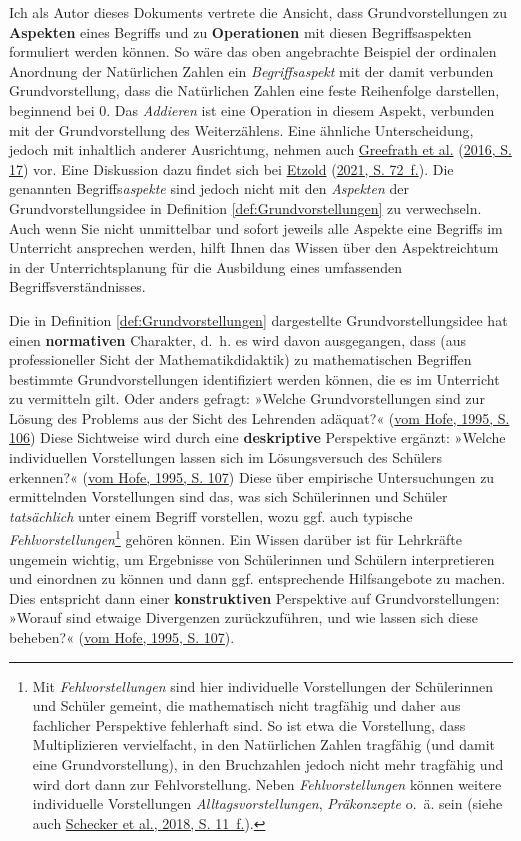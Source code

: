 \documentclass[
  ngerman,
]{scrbook}
\theoremstyle{definition}
\theoremstyle{definition}
\theoremstyle{definition}
\theoremstyle{definition}
\theoremstyle{remark}
\begin{document}
Ich als Autor dieses Dokuments vertrete die Ansicht, dass Grundvorstellungen zu \textbf{Aspekten} eines Begriffs und zu \textbf{Operationen} mit diesen Begriffsaspekten formuliert werden können. So wäre das oben angebrachte Beispiel der ordinalen Anordnung der Natürlichen Zahlen ein \emph{Begriffsaspekt} mit der damit verbunden Grundvorstellung, dass die Natürlichen Zahlen eine feste Reihenfolge darstellen, beginnend bei \(0\). Das \emph{Addieren} ist eine Operation in diesem Aspekt, verbunden mit der Grundvorstellung des Weiterzählens. Eine ähnliche Unterscheidung, jedoch mit inhaltlich anderer Ausrichtung, nehmen auch \protect\hyperlink{ref-Greefrath2016}{Greefrath et al.} (\protect\hyperlink{ref-Greefrath2016}{2016, S. 17}) vor. Eine Diskussion dazu findet sich bei \protect\hyperlink{ref-Etzold2021}{Etzold} (\protect\hyperlink{ref-Etzold2021}{2021, S. 72~f.}). Die genannten Begriffs\emph{aspekte} sind jedoch nicht mit den \emph{Aspekten} der Grundvorstellungsidee in Definition \ref{def:Grundvorstellungen} zu verwechseln.
Auch wenn Sie nicht unmittelbar und sofort jeweils alle Aspekte eine Begriffs im Unterricht ansprechen werden, hilft Ihnen das Wissen über den Aspektreichtum in der Unterrichtsplanung für die Ausbildung eines umfassenden Begriffsverständnisses.

Die in Definition \ref{def:Grundvorstellungen} dargestellte Grundvorstellungsidee hat einen \textbf{normativen} Charakter, d.~h. es wird davon ausgegangen, dass (aus professioneller Sicht der Mathematikdidaktik) zu mathematischen Begriffen bestimmte Grundvorstellungen identifiziert werden können, die es im Unterricht zu vermitteln gilt. Oder anders gefragt: »Welche Grundvorstellungen sind zur Lösung des Problems aus der Sicht des Lehrenden adäquat?« (\protect\hyperlink{ref-Hofe:1995}{vom Hofe, 1995, S. 106}) Diese Sichtweise wird durch eine \textbf{deskriptive} Perspektive ergänzt: »Welche individuellen Vorstellungen lassen sich im Lösungsversuch des Schülers erkennen?« (\protect\hyperlink{ref-Hofe:1995}{vom Hofe, 1995, S. 107}) Diese über empirische Untersuchungen zu ermittelnden Vorstellungen sind das, was sich Schülerinnen und Schüler \emph{tatsächlich} unter einem Begriff vorstellen, wozu ggf. auch typische \emph{Fehlvorstellungen}\footnote{Mit \emph{Fehlvorstellungen} sind hier individuelle Vorstellungen der Schülerinnen und Schüler gemeint, die mathematisch nicht tragfähig und daher aus fachlicher Perspektive fehlerhaft sind. So ist etwa die Vorstellung, dass Multiplizieren vervielfacht, in den Natürlichen Zahlen tragfähig (und damit eine Grundvorstellung), in den Bruchzahlen jedoch nicht mehr tragfähig und wird dort dann zur Fehlvorstellung. Neben \emph{Fehlvorstellungen} können weitere individuelle Vorstellungen \emph{Alltagsvorstellungen}, \emph{Präkonzepte} o.~ä. sein (siehe auch \protect\hyperlink{ref-Schecker2018}{Schecker et al., 2018, S. 11~f.}).} gehören können. Ein Wissen darüber ist für Lehrkräfte ungemein wichtig, um Ergebnisse von Schülerinnen und Schülern interpretieren und einordnen zu können und dann ggf. entsprechende Hilfsangebote zu machen. Dies entspricht dann einer \textbf{konstruktiven} Perspektive auf Grundvorstellungen: »Worauf sind etwaige Divergenzen zurückzuführen, und wie lassen sich diese beheben?« (\protect\hyperlink{ref-Hofe:1995}{vom Hofe, 1995, S. 107}).
\end{document}
